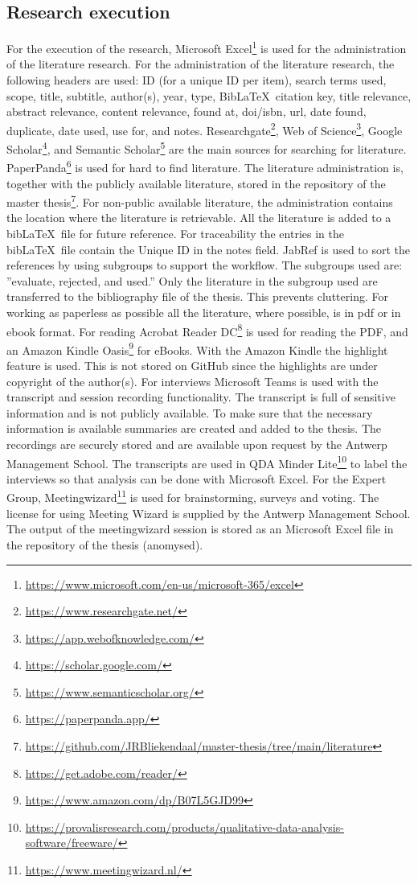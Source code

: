 \subsection{Research execution}
\label{sub:tbresearchexecution}
For the execution of the research, Microsoft Excel\footnote{\url{https://www.microsoft.com/en-us/microsoft-365/excel}} is used for the administration of the literature research. For the administration of the literature research, the following headers are used: ID (for a unique ID per item), search terms used, scope, title, subtitle, author(s), year, type, Bib\LaTeX\ citation key, title relevance, abstract relevance, content relevance, found at, doi/isbn, url, date found, duplicate, date used, use for, and notes. Researchgate\footnote{\url{https://www.researchgate.net/}}, Web of Science\footnote{\url{https://app.webofknowledge.com/}}, Google Scholar\footnote{\url{https://scholar.google.com/}}, and Semantic Scholar\footnote{\url{https://www.semanticscholar.org/}} are the main sources for searching for literature. PaperPanda\footnote{\url{https://paperpanda.app/}} is used for hard to find literature. The literature administration is, together with the publicly available literature, stored in the repository of the master thesis\footnote{\url{https://github.com/JRBliekendaal/master-thesis/tree/main/literature}}. For non-public available literature, the administration contains the location where the literature is retrievable. All the literature is added to a bib\LaTeX\ file for future reference. For traceability the entries in the bib\LaTeX\ file contain the Unique ID in the notes field. JabRef is used to sort the references by using subgroups to support the workflow. The subgroups used are: ''evaluate, rejected, and used.'' Only the literature in the subgroup used are transferred to the bibliography file of the thesis. This prevents cluttering. For working as paperless as possible all the literature, where possible, is in pdf or in ebook format. For reading Acrobat Reader DC\footnote{\url{https://get.adobe.com/reader/}} is used for reading the PDF, and an Amazon Kindle Oasis\footnote{\url{https://www.amazon.com/dp/B07L5GJD99}} for eBooks. With the Amazon Kindle the highlight feature is used. This is not stored on GitHub since the highlights are under copyright of the author(s). For interviews Microsoft Teams is used with the transcript and session recording functionality. The transcript is full of sensitive information and is not publicly available. To make sure that the necessary information is available summaries are created and added to the thesis. The recordings are securely stored and are available upon request by the Antwerp Management School. The transcripts are used in QDA Minder Lite\footnote{\url{https://provalisresearch.com/products/qualitative-data-analysis-software/freeware/}} to label the interviews so that analysis can be done with Microsoft Excel. For the Expert Group, Meetingwizard\footnote{\url{https://www.meetingwizard.nl/}} is used for brainstorming, surveys and voting. The license for using Meeting Wizard is supplied by the Antwerp Management School. The output of the meetingwizard session is stored as an Microsoft Excel file in the repository of the thesis (anomysed).
